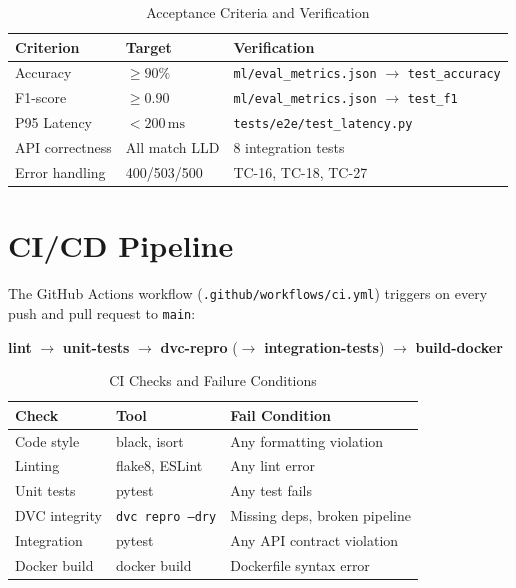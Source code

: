 \documentclass[conference]{IEEEtran}
\begin{document}
\begin{table}[H]
\centering
\caption{Acceptance Criteria and Verification}
\label{tab:acceptance}
\begin{tabular}{@{}L{1.8cm}L{1.5cm}L{4.2cm}@{}}
\toprule
\textbf{Criterion} & \textbf{Target} & \textbf{Verification} \\
\midrule
Accuracy       & $\geq 90\%$     & \texttt{ml/eval\_metrics.json} $\to$ \texttt{test\_accuracy} \\
F1-score       & $\geq 0.90$     & \texttt{ml/eval\_metrics.json} $\to$ \texttt{test\_f1} \\
P95 Latency    & $< 200\,\text{ms}$ & \texttt{tests/e2e/test\_latency.py} \\
API correctness & All match LLD  & 8 integration tests \\
Error handling  & 400/503/500    & TC-16, TC-18, TC-27 \\
\bottomrule
\end{tabular}
\end{table}

\section{CI/CD Pipeline}
\label{sec:cicd}

The GitHub Actions workflow (\texttt{.github/workflows/ci.yml}) triggers on every push and pull request to \texttt{main}:

\medskip
\textbf{lint} $\to$ \textbf{unit-tests} $\to$ \textbf{dvc-repro} ($\to$ \textbf{integration-tests}) $\to$ \textbf{build-docker}
\medskip

\begin{table}[H]
\centering
\caption{CI Checks and Failure Conditions}
\label{tab:ci}
\begin{tabular}{@{}L{2cm}L{2.5cm}L{3cm}@{}}
\toprule
\textbf{Check} & \textbf{Tool} & \textbf{Fail Condition} \\
\midrule
Code style      & black, isort   & Any formatting violation \\
Linting         & flake8, ESLint & Any lint error \\
Unit tests      & pytest         & Any test fails \\
DVC integrity   & \texttt{dvc repro --dry} & Missing deps, broken pipeline \\
Integration     & pytest         & Any API contract violation \\
Docker build    & docker build   & Dockerfile syntax error \\
\bottomrule
\end{tabular}
\end{table}
\end{document}
